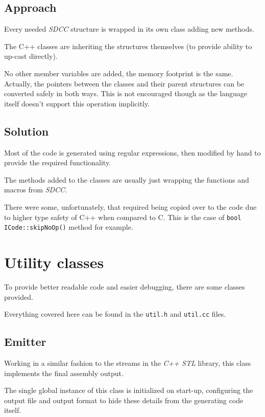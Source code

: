         \subsection{Approach}

        Every needed \emph{SDCC} structure is wrapped in its own class adding new methods.

        The C++ classes are inheriting the structures themselves (to provide ability to up-cast directly).

        No other member variables are added, the memory footprint is the same. Actually, the pointers between the classes and their parent structures can be converted safely in both ways. This is not encouraged though as the language itself doesn't support this operation implicitly.

        \subsection{Solution}

        Most of the code is generated using regular expressions, then modified by hand to provide the required functionality.

        The methods added to the classes are usually just wrapping the functions and macros from \emph{SDCC}.

        There were some, unfortunately, that required being copied over to the code due to higher type safety of C++ when compared to C. This is the case of \texttt{bool ICode::skipNoOp()} method for example.

    \section{Utility classes}

    To provide better readable code and easier debugging, there are some classes provided.

    Everything covered here can be found in the \texttt{util.h} and \texttt{util.cc} files.

        \subsection{Emitter}\label{emitter}

        Working in a similar fashion to the streams in the \emph{C++ STL} library, this class implements the final assembly output.

        The single global instance of this class is initialized on start-up, configuring the output file and output format to hide these details from the generating code itself.

